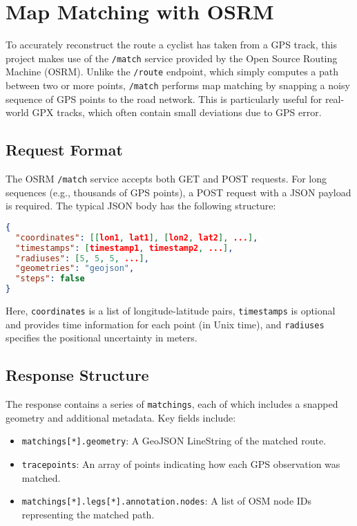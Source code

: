 \documentclass[12pt,a4paper]{report}
\begin{document}
\section{Map Matching with OSRM}

To accurately reconstruct the route a cyclist has taken from a GPS track, this project makes use of the \texttt{/match} service provided by the Open Source Routing Machine (OSRM). Unlike the \texttt{/route} endpoint, which simply computes a path between two or more points, \texttt{/match} performs map matching by snapping a noisy sequence of GPS points to the road network. This is particularly useful for real-world GPX tracks, which often contain small deviations due to GPS error.

\subsection{Request Format}

The OSRM \texttt{/match} service accepts both GET and POST requests. For long sequences (e.g., thousands of GPS points), a POST request with a JSON payload is required. The typical JSON body has the following structure:

\begin{lstlisting}[language=json]
{
  "coordinates": [[lon1, lat1], [lon2, lat2], ...],
  "timestamps": [timestamp1, timestamp2, ...],
  "radiuses": [5, 5, 5, ...],
  "geometries": "geojson",
  "steps": false
}
\end{lstlisting}

Here, \texttt{coordinates} is a list of longitude-latitude pairs, \texttt{timestamps} is optional and provides time information for each point (in Unix time), and \texttt{radiuses} specifies the positional uncertainty in meters.

\subsection{Response Structure}

The response contains a series of \texttt{matchings}, each of which includes a snapped geometry and additional metadata. Key fields include:

\begin{itemize}
	\item \texttt{matchings[*].geometry}: A GeoJSON LineString of the matched route.
	\item \texttt{tracepoints}: An array of points indicating how each GPS observation was matched.
	\item \texttt{matchings[*].legs[*].annotation.nodes}: A list of OSM node IDs representing the matched path.
\end{itemize}
\end{document}
